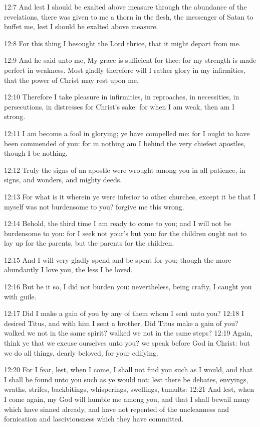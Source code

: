 12:7 And lest I should be exalted above measure through the abundance of the revelations, there was given to me a thorn in the flesh, the messenger of Satan to buffet me, lest I should be exalted above measure.

12:8 For this thing I besought the Lord thrice, that it might depart from me.

12:9 And he said unto me, My grace is sufficient for thee: for my strength is made perfect in weakness. Most gladly therefore will I rather glory in my infirmities, that the power of Christ may rest upon me.

12:10 Therefore I take pleasure in infirmities, in reproaches, in necessities, in persecutions, in distresses for Christ's sake: for when I am weak, then am I strong.

12:11 I am become a fool in glorying; ye have compelled me: for I ought to have been commended of you: for in nothing am I behind the very chiefest apostles, though I be nothing.

12:12 Truly the signs of an apostle were wrought among you in all patience, in signs, and wonders, and mighty deeds.

12:13 For what is it wherein ye were inferior to other churches, except it be that I myself was not burdensome to you? forgive me this wrong.

12:14 Behold, the third time I am ready to come to you; and I will not be burdensome to you: for I seek not your's but you: for the children ought not to lay up for the parents, but the parents for the children.

12:15 And I will very gladly spend and be spent for you; though the more abundantly I love you, the less I be loved.

12:16 But be it so, I did not burden you: nevertheless, being crafty, I caught you with guile.

12:17 Did I make a gain of you by any of them whom I sent unto you?  12:18 I desired Titus, and with him I sent a brother. Did Titus make a gain of you? walked we not in the same spirit? walked we not in the same steps?  12:19 Again, think ye that we excuse ourselves unto you?  we speak before God in Christ: but we do all things, dearly beloved, for your edifying.

12:20 For I fear, lest, when I come, I shall not find you such as I would, and that I shall be found unto you such as ye would not: lest there be debates, envyings, wraths, strifes, backbitings, whisperings, swellings, tumults: 12:21 And lest, when I come again, my God will humble me among you, and that I shall bewail many which have sinned already, and have not repented of the uncleanness and fornication and lasciviousness which they have committed.

